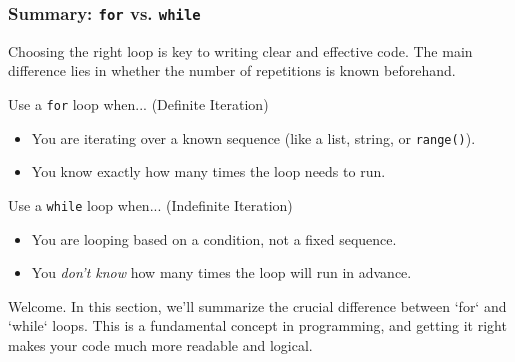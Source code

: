 \documentclass{beamer}
\begin{document}
\begin{frame}[fragile]
\end{frame}

\begin{frame}[fragile]
    \frametitle{Summary: \texttt{for} vs. \texttt{while}}
    \subtitle{Choosing the Right Tool for Repetition}

    Choosing the right loop is key to writing clear and effective code. The main difference lies in whether the number of repetitions is known beforehand.
    \vspace{1em}
    
    \begin{block}{Use a \texttt{for} loop when... (Definite Iteration)}
        \begin{itemize}
            \item You are iterating over a known sequence (like a list, string, or \texttt{range()}).
            \item You know exactly how many times the loop needs to run.
        \end{itemize}
    \end{block}
    
    \begin{block}{Use a \texttt{while} loop when... (Indefinite Iteration)}
        \begin{itemize}
            \item You are looping based on a condition, not a fixed sequence.
            \item You \textit{don't know} how many times the loop will run in advance.
        \end{itemize}
    \end{block}

    \begin{note}
    Welcome. In this section, we'll summarize the crucial difference between `for` and `while` loops. This is a fundamental concept in programming, and getting it right makes your code much more readable and logical.


\end{note}
\end{frame}
\end{document}
